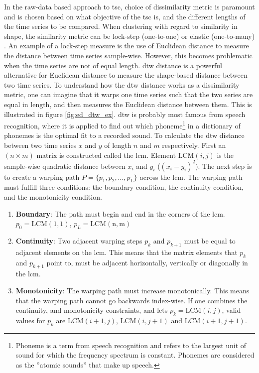 In the raw-data based approach to \acrshort{tsc}, choice of dissimilarity metric is paramount and is chosen based on what objective of the \acrshort{tsc} is, and the different lengths of the time series to be compared. When clustering with regard to similarity in shape, the similarity metric can be lock-step (one-to-one) or elastic (one-to-many) \cite{tsc_rev}. An example of a lock-step measure is the use of Euclidean distance to measure the distance between time series sample-wise. However, this becomes problematic when the time series are not of equal length. \acrfull{dtw} distance is a powerful alternative for Euclidean distance to measure the shape-based distance between two time series. To understand how the \acrshort{dtw} distance works as a dissimilarity metric, one can imagine that it warps one time series such that the two series are equal in length, and then measures the Euclidean distance between them. This is illustrated in figure \ref{fig:ed_dtw_ex}. \acrshort{dtw} is probably most famous from speech recognition, where it is applied to find out which phoneme\footnote{Phoneme is a term from speech recognition and refers to the largest unit of sound for which the frequency spectrum is constant. Phonemes are considered as the ''atomic sounds'' that make up speech.} in a dictionary of phonemes is the optimal fit to a recorded sound. To calculate the \acrshort{dtw} distance between two time series $x$ and $y$ of length $n$ and $m$ respectively. First an $(n \times m)$ matrix is constructed called the \acrfull{lcm}. Element $\mathrm{LCM}(i,j)$ is the sample-wise quadratic distance between $x_i$ and $y_i$ ($(x_i - y_i)^2$). The next step is to create a warping path $P = \{p_1, p_2, ..., p_L\}$ across the \acrshort{lcm}. The warping path must fulfill three conditions: the boundary condition, the continuity condition, and the monotonicity condition. 

\begin{enumerate} 
    \item \textbf{Boundary}: The path must begin and end in the corners of the \acrshort{lcm}. $p_0 = \mathrm{LCM(1,1)}$, $p_L = \mathrm{LCM(n,m)}$ 
    \item \textbf{Continuity}: Two adjacent warping steps $p_k$ and $p_{k+1}$ must be equal to adjacent elements on the \acrshort{lcm}. This means that the matrix elements that $p_k$ and $p_{k+1}$ point to, must be adjacent horizontally, vertically or diagonally in the \acrshort{lcm}.
    \item \textbf{Monotonicity}: The warping path must increase monotonically. This means that the warping path cannot go backwards index-wise. If one combines the continuity, and monotonicity constraints, and lets $p_k = \mathrm{LCM}(i,j)$, valid values for $p_k$ are $\mathrm{LCM}(i+1,j)$, $\mathrm{LCM}(i,j+1)$ and $\mathrm{LCM}(i+1,j+1)$.
\end{enumerate}

